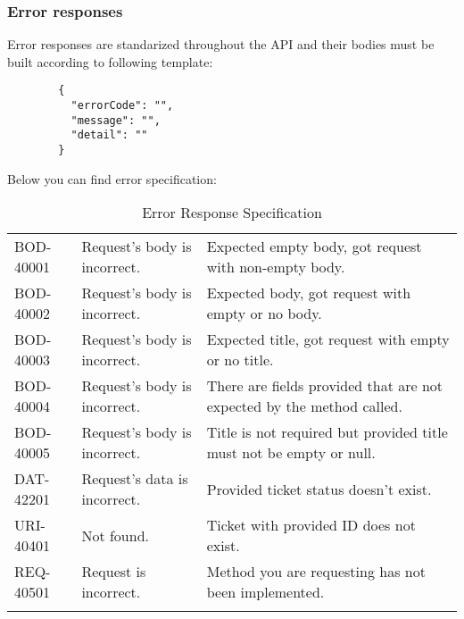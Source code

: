 \documentclass[a4paper]{article}
\begin{document}
    \subsubsection{Error responses}
    Error responses are standarized throughout the API and their bodies must be built according to following template:
    \begin{verbatim}
        {
          "errorCode": "",
          "message": "",
          "detail": ""
        }
    \end{verbatim}
    Below you can find error specification:
    \begin{table}[htbp]
        \centering
        \caption{Error Response Specification}
        \begin{tabularx}{\linewidth}{|l|X|X|}
            \hline
            \centering{Error Code} & \centering{Message} & \centering{Detail} \tabularnewline \hline
            BOD-40001 & Request's body is incorrect. & Expected empty body, got request with non-empty body. \tabularnewline \hline
            BOD-40002 & Request's body is incorrect. & Expected body, got request with empty or no body. \tabularnewline \hline
            BOD-40003 & Request's body is incorrect. & Expected title, got request with empty or no title. \tabularnewline \hline
            BOD-40004 & Request's body is incorrect. & There are fields provided that are not expected by the method called. \tabularnewline \hline
            BOD-40005 & Request's body is incorrect. & Title is not required but provided title must not be empty or null. \tabularnewline \hline
            DAT-42201 & Request's data is incorrect. & Provided ticket status doesn't exist. \tabularnewline \hline
            URI-40401 & Not found. & Ticket with provided ID does not exist. \tabularnewline \hline
            REQ-40501 & Request is incorrect. & Method you are requesting has not been implemented. \tabularnewline \hline
            \hfill & \hfill & \hfill \tabularnewline \hline
        \end{tabularx}
    \end{table}
\end{document}
